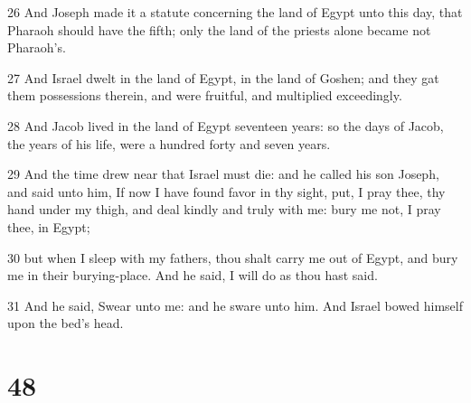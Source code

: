 \par 26 And Joseph made it a statute concerning the land of Egypt unto this day, that Pharaoh should have the fifth; only the land of the priests alone became not Pharaoh's.
\par 27 And Israel dwelt in the land of Egypt, in the land of Goshen; and they gat them possessions therein, and were fruitful, and multiplied exceedingly.
\par 28 And Jacob lived in the land of Egypt seventeen years: so the days of Jacob, the years of his life, were a hundred forty and seven years.
\par 29 And the time drew near that Israel must die: and he called his son Joseph, and said unto him, If now I have found favor in thy sight, put, I pray thee, thy hand under my thigh, and deal kindly and truly with me: bury me not, I pray thee, in Egypt;
\par 30 but when I sleep with my fathers, thou shalt carry me out of Egypt, and bury me in their burying-place. And he said, I will do as thou hast said.
\par 31 And he said, Swear unto me: and he sware unto him. And Israel bowed himself upon the bed's head.

\chapter{48}


